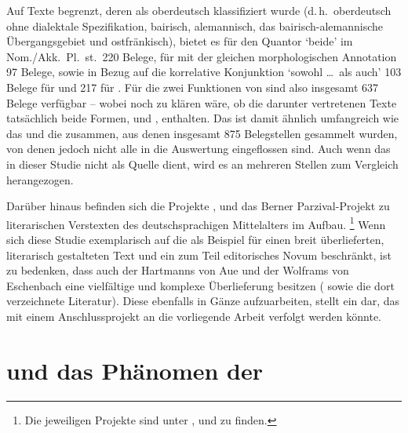 Auf Texte begrenzt, deren  als oberdeutsch
klassifiziert wurde (d.\,h.\ oberdeutsch ohne dialektale
Spezifikation, bairisch, alemannisch, das
bai\-risch-alemannische
Übergangsgebiet und ostfränkisch), bietet es
für den Quantor  `beide' im Nom./Akk.~Pl.~st.\ 220 Belege, für
 mit der gleichen morphologischen Annotation 97
Belege, sowie in Bezug auf die korrelative Konjunktion 
`sowohl \dots\ als auch' 103 Belege für  und 217 für .
Für die zwei Funktionen von  sind also insgesamt 637 Belege
verfügbar -- wobei noch zu klären wäre, ob die darunter vertretenen Texte
tatsächlich beide Formen,  und , enthalten. Das \REM{}
ist damit ähnlich umfangreich wie das \CAO{} und die \KC{} zusammen, aus denen
insgesamt 875 Belegstellen gesammelt wurden, von denen jedoch nicht alle in die
Auswertung eingeflossen sind. Auch wenn das \REM{} in dieser Studie nicht als
Quelle dient, wird es an mehreren Stellen zum Vergleich herangezogen.

Darüber hinaus befinden sich die Projekte 
\autocite{iwdigital},  \autocite{ldmdigital} und das
Berner Parzival-Projekt \autocite{parzivalprojekt} zu literarischen Verstexten
des deutschsprachigen Mittelalters im Aufbau.%
%
	\footnote{Die jeweiligen Projekte sind unter ,
	 und  zu finden.}
%
Wenn sich diese Studie exemplarisch auf die \KC{} als Beispiel für einen breit
überlieferten, literarisch gestalteten Text und ein zum Teil editorisches Novum
beschränkt, ist zu bedenken, dass auch der  Hartmanns von
Aue und der  Wolframs von
Eschenbach eine vielfältige und komplexe
Überlieferung besitzen (\cite[vgl.][s.\,v.~\textit{:
}, \textit{: }]{hsc} sowie
die dort verzeichnete Literatur). Diese ebenfalls in Gänze aufzuarbeiten,
stellt ein  dar, das mit einem Anschlussprojekt an die
vorliegende Arbeit verfolgt werden könnte.

\section{ und das Phänomen der }
\label{sec:einlgendres}

